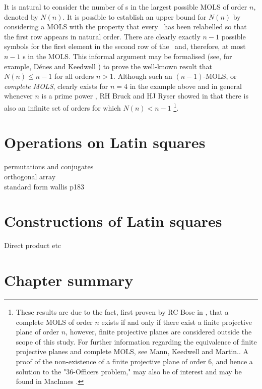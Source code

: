   It is natural to consider the number of \lat s in the largest possible MOLS of order $n$, denoted by $N(n)$. It is possible to establish an upper bound for $N(n)$ by considering a MOLS with the property that every \lat \ has been relabelled so that the first row appears in natural order. There are clearly exactly $n-1$ possible symbols for the first element in the second row of the \lat \ and, therefore, at most $n-1$ \lat s in the MOLS. This informal argument may  be formalised (see, for example, D\'enes and Keedwell \cite[Theorem 5.1.5]{Denes1}) to prove the well-known result that $N(n) \leq n-1$ for all orders  $n>1$. Although such an $(n-1)$-MOLS, or \emph{complete MOLS}, clearly exists for $n = 4$ in the example above and in general whenever $n$ is a prime power \cite{}, RH Bruck and HJ Ryser showed in \cite{bruck} that there is also an infinite set of orders for which $N(n) <n-1$  \footnote{These results are due to the fact, first proven by RC Bose in \cite{bosepp}, that a complete MOLS of order $n$ exists if and only if there exist  a finite projective plane of order $n$, however, finite projective planes are considered outside the scope of this study. For further information regarding the equivalence of finite projective planes and complete MOLS, see Mann, Keedwell and Martin.\cite{mann}.  A proof of the non-existence of a finite projective plane of order 6, and hence a solution to the "36-Officers problem," may also be of interest and may be found in MacInnes \cite{McInnes}.}.
    

 
\section{Operations on Latin squares}

permutations and conjugates\\
orthogonal array\\

standard form wallis p183

\section{Constructions of Latin squares}
Direct product etc

\section{Chapter summary}
